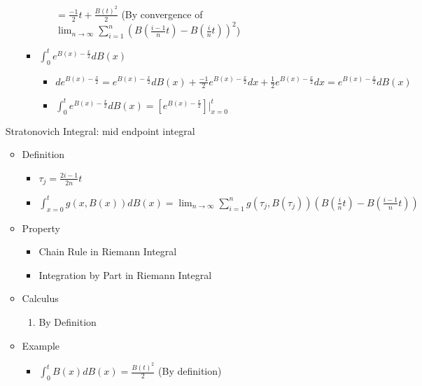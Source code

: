 \documentclass[a4paper]{article}
\begin{document}
\begin{itemize}
\begin{itemize}
\begin{itemize}
\begin{itemize}
                            $= \frac{-1}{2} t + \frac{B(t)^2}{2}$ (By convergence of $\lim_{n \rightarrow \infty} \sum_{i=1}^n (B(\frac{i-1}{n}t) - B(\frac{i}{n}t))^2$)
                        \end{itemize}
                    \item $\int_0^t e^{B(x) - \frac{x}{2}} d B(x)$
                        \begin{itemize}
                            \item $d e^{B(x) - \frac{x}{2}} = e^{B(x) - \frac{x}{2}} d B(x) + \frac{-1}{2} e^{B(x) - \frac{x}{2}} d x + \frac{1}{2} e^{B(x) - \frac{x}{2}} d x = e^{B(x) - \frac{x}{2}} d B(x)$
                            \item $\int_0^t e^{B(x) - \frac{x}{2}} d B(x) = [e^{B(x) - \frac{x}{2}}]|_{x=0}^t$
                        \end{itemize}
                \end{itemize}
        \end{itemize}
        Stratonovich Integral: mid endpoint integral
        \begin{itemize}
            \item Definition
                \begin{itemize}
                    \item $\tau_j = \frac{2i-1}{2n}t$
                    \item $\int_{x=0}^t g(x, B(x)) dB(x) = \lim_{n \rightarrow \infty} \sum_{i=1}^n g(\tau_j, B(\tau_j))(B(\frac{i}{n}t) - B(\frac{i-1}{n}t))$
                \end{itemize}
            \item Property
                \begin{itemize}
                    \item Chain Rule in Riemann Integral
                    \item Integration by Part in Riemann Integral
                \end{itemize}
            \item Calculus
                \begin{enumerate}
                    \item By Definition
                \end{enumerate}
            \item Example
                \begin{itemize}
                    \item $\int_0^t B(x) d B(x) = \frac{B(t)^2}{2}$ (By definition)
                \end{itemize}
        \end{itemize}
\end{itemize}
\end{document}
